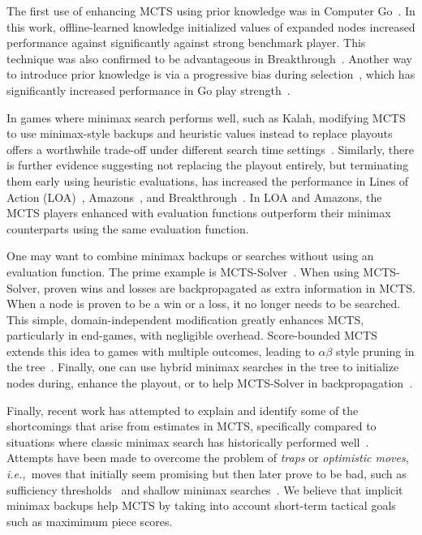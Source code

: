 \documentclass[letterpaper]{article}
\newcommand{\ie}{{\it i.e.,}~}
\begin{document}
The first use of enhancing MCTS using prior knowledge was in Computer Go~\cite{Gelly07Combining}. 
In this work, offline-learned knowledge initialized values of expanded nodes increased performance against significantly against 
strong benchmark player. This technique was also confirmed to be advantageous in Breakthrough~\cite{Lorentz13Breakthrough}. 
Another way to introduce prior knowledge is via a progressive bias during selection~\cite{Chaslot08Progressive}, which has 
significantly increased performance in Go play strength~\cite{Gelly07Combining}. 

In games where minimax search performs well, such as Kalah, 
modifying MCTS to use minimax-style backups and heuristic values instead to replace playouts offers a worthwhile trade-off 
under different search time settings~\cite{Ramanujan11Tradeoffs}.
Similarly, there is further evidence suggesting not replacing the playout entirely, but terminating them early 
using heuristic evaluations, has increased the performance in Lines of Action (LOA)~\cite{Winands10MCTS-LOA}, 
Amazons~\cite{Kloetzer10Amazons,Lorentz08Amazons}, and Breakthrough~\cite{Lorentz13Breakthrough}. In LOA and Amazons, the 
MCTS players enhanced with evaluation functions outperform their minimax counterparts using the same evaluation function.


One may want to combine minimax backups or searches without using an evaluation function. 
The prime example is MCTS-Solver~\cite{Winands08Solver}. When using 
MCTS-Solver, proven wins and losses are backpropagated as extra information in MCTS. When a node is proven to be a 
win or a loss, it no longer needs to be searched. This simple, domain-independent modification greatly enhances 
MCTS, particularly in end-games, with negligible overhead. Score-bounded MCTS extends this idea to games with multiple 
outcomes, leading to $\alpha \beta$ style pruning in the tree~\cite{Cazenave10ScoreBounded}. Finally, one can use hybrid
minimax searches in the tree to initialize nodes during, enhance the playout, or to help MCTS-Solver 
in backpropagation~\cite{Baier13MinimaxHybrids}.

Finally, recent work has attempted to explain and identify some of the shortcomings that arise from estimates in 
MCTS, specifically compared to situations where classic minimax search has historically performed 
well~\cite{Ramanujan10Understanding,Ramanujan10On}. 
Attempts have been made to overcome the problem of {\it traps} or {\it optimistic moves}, \ie moves that initially seem 
promising but then later prove to be bad, such as sufficiency 
thresholds~\cite{Gudmindsson13Sufficiency} and shallow minimax searches~\cite{Baier13MinimaxHybrids}. We believe that 
implicit minimax backups help MCTS by taking into account short-term tactical goals such as maximimum piece scores. 
\end{document}
